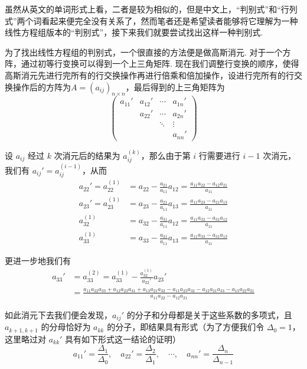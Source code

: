 虽然从英文的单词形式上看，二者是较为相似的，但是中文上，``判别式''和``行列式''两个词看起来便完全没有关系了，然而笔者还是希望读者能够将它理解为一种线性方程组版本的``判别式''，接下来我们就要尝试找出这样一种判别式.

为了找出线性方程组的判别式，一个很直接的方法便是做高斯消元. 对于一个方阵，通过初等行变换可以得到一个上三角矩阵. 现在我们调整行变换的顺序，使得高斯消元先进行完所有的行交换操作再进行倍乘和倍加操作，设进行完所有的行交换操作后的方阵为$A=(a_{ij})_{n\times n}$，最后得到的上三角矩阵为
\[
\begin{pmatrix}
    a_{11}' & a_{12}' & \cdots & a_{1n}' \\
            & a_{22}' & \cdots & a_{2n}' \\
            &         & \ddots & \vdots  \\
            &         &        & a_{nn}'
\end{pmatrix}
\]

设 $a_{ij}$ 经过 $k$ 次消元后的结果为 $a_{ij}^{(k)}$，那么由于第 $i$ 行需要进行 $i-1$ 次消元，我们有 $a_{ij}' = a_{ij}^{(i-1)}$，从而
\begin{align*}
    a_{22}' = a_{22}^{(1)} &= a_{22} - \frac{a_{21}}{a_{11}}a_{12} = \frac{a_{11}a_{22}-a_{12}a_{21}}{a_{11}} \\
    a_{23}' = a_{23}^{(1)} &= a_{23} - \frac{a_{21}}{a_{11}}a_{13} = \frac{a_{11}a_{23}-a_{21}a_{13}}{a_{11}} \\
     a_{32}^{(1)} &= a_{32} - \frac{a_{31}}{a_{11}}a_{12} = \frac{a_{11}a_{32}-a_{31}a_{12}}{a_{11}} \\
     a_{33}^{(1)} &= a_{33} - \frac{a_{31}}{a_{11}}a_{13} = \frac{a_{11}a_{33}-a_{31}a_{13}}{a_{11}}
\end{align*}

更进一步地我们有
\begin{align*}
    a_{33}' &= a_{33}^{(2)} = a_{33}^{(1)} - \frac{a_{32}^{(1)}}{a_{22}'}a_{23}' \\
    &= \frac{a_{11}a_{22}a_{33} + a_{12}a_{23}a_{31}+a_{13}a_{21}a_{32}-a_{11}a_{23}a_{32}-a_{12}a_{21}a_{33} - a_{13}a_{22}a_{31}}{a_{11}a_{22}- a_{12}a_{21}}
\end{align*}

如此消元下去我们便会发现，$a_{ij}'$ 的分子和分母都是关于这些系数的多项式，且 $a_{k+1,k+1}$ 的分母恰好为 $a_{kk}$ 的分子，即结果具有形式（为了方便我们令 $\Delta_0 = 1$，这里略过对 $a_{kk}'$ 具有如下形式这一结论的证明）
\[
a_{11}' = \frac{\Delta_1}{\Delta_0},\quad a_{22}' = \frac{\Delta_2}{\Delta_1},\quad \cdots,\quad a_{nn}' = \frac{\Delta_n}{\Delta_{n-1}}
\]

